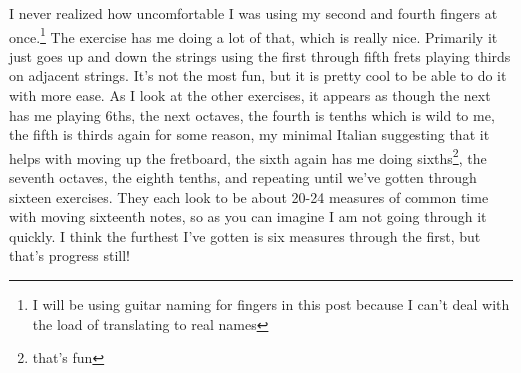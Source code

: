 \documentclass[12pt]{article}[titlepage]
\newcommand{\1}{\={a}}
\newcommand{\2}{\={e}}
\newcommand{\3}{\={\i}}
\newcommand{\4}{\=o}
\newcommand{\5}{\=u}
\newcommand{\6}{\={A}}
\renewcommand{\,}{\textsuperscript{,}}
\begin{document}
I never realized how uncomfortable I was using my second and fourth fingers at once.\footnote{I will be using guitar naming for fingers in this post because I can't deal with the load of translating to real names}
The exercise has me doing a lot of that, which is really nice.
Primarily it just goes up and down the strings using the first through fifth frets playing thirds on adjacent strings.
It's not the most fun, but it is pretty cool to be able to do it with more ease.
As I look at the other exercises, it appears as though the next has me playing 6ths, the next octaves, the fourth is tenths which is wild to me, the fifth is thirds again for some reason, my minimal Italian suggesting that it helps with moving up the fretboard, the sixth again has me doing sixths\footnote{that's fun}, the seventh octaves, the eighth tenths, and repeating until we've gotten through sixteen exercises.
They each look to be about 20-24 measures of common time with moving sixteenth notes, so as you can imagine I am not going through it quickly.
I think the furthest I've gotten is six measures through the first, but that's progress still!
\end{document}
